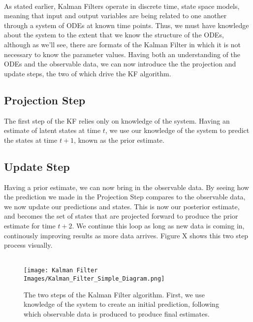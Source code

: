 \documentclass{article}
\begin{document}
\\
As stated earlier, Kalman Filters operate in discrete time, state space models, meaning that input and output variables are being related to one another through a system of ODEs at known time points. Thus, we must have knowledge about the system to the extent that we know the structure of the ODEs, although as we'll see, there are formats of the Kalman Filter in which it is not necessary to know the parameter values. Having both an understanding of the ODEs and the observable data, we can now introduce the the projection and update steps, the two of which drive the KF algorithm. 
\subsection{Projection Step}
The first step of the KF relies only on knowledge of the system. Having an estimate of latent states at time $t$, we use our knowledge of the system to predict the states at time $t + 1$, known as the prior estimate.
\subsection{Update Step}
Having a prior estimate, we can now bring in the observable data. By seeing how the prediction we made in the Projection Step compares to the observable data, we now update our predictions and states. This is now our posterior estimate, and becomes the set of states that are projected forward to produce the prior estimate for time $t+2$. We continue this loop as long as new data is coming in, continously improving results as more data arrives. Figure X shows this two step process visually. \\
\\
\begin{figure}[H]
    \centering
    \texttt{[image: Kalman Filter Images/Kalman\_Filter\_Simple\_Diagram.png]}
    \caption{The two steps of the Kalman Filter algorithm. First, we use knowledge of the system to create an initial prediction, following which observable data is produced to produce final estimates.}

\end{figure}
\end{document}
